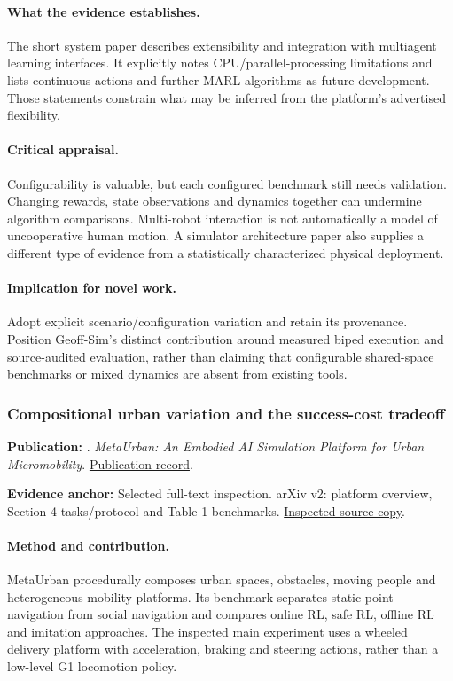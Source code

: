 \paragraph{What the evidence establishes.} The short system paper describes extensibility and integration with multiagent learning interfaces. It explicitly notes CPU/parallel-processing limitations and lists continuous actions and further MARL algorithms as future development. Those statements constrain what may be inferred from the platform's advertised flexibility.

\paragraph{Critical appraisal.} Configurability is valuable, but each configured benchmark still needs validation. Changing rewards, state observations and dynamics together can undermine algorithm comparisons. Multi-robot interaction is not automatically a model of uncooperative human motion. A simulator architecture paper also supplies a different type of evidence from a statistically characterized physical deployment.

\paragraph{Implication for novel work.} Adopt explicit scenario/configuration variation and retain its provenance. Position Geoff-Sim's distinct contribution around measured biped execution and source-audited evaluation, rather than claiming that configurable shared-space benchmarks or mixed dynamics are absent from existing tools.

\subsubsection{Compositional urban variation and the success-cost tradeoff}\label{paper:metaurban}
\textbf{Publication:} \citet{metaurban}. \emph{MetaUrban: An Embodied AI Simulation Platform for Urban Micromobility}. \href{https://arxiv.org/abs/2407.08725}{Publication record}.

\textbf{Evidence anchor:} Selected full-text inspection. arXiv v2: platform overview, Section 4 tasks/protocol and Table 1 benchmarks. \href{https://arxiv.org/pdf/2407.08725}{Inspected source copy}.

\paragraph{Method and contribution.} MetaUrban procedurally composes urban spaces, obstacles, moving people and heterogeneous mobility platforms. Its benchmark separates static point navigation from social navigation and compares online RL, safe RL, offline RL and imitation approaches. The inspected main experiment uses a wheeled delivery platform with acceleration, braking and steering actions, rather than a low-level G1 locomotion policy.

